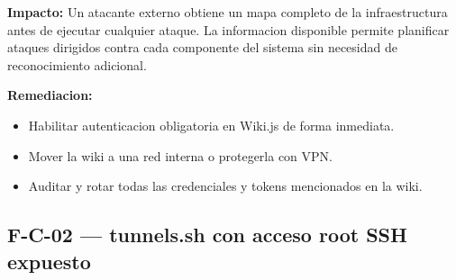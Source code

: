 \documentclass[11pt,a4paper]{article}
\begin{document}
\begin{tcolorbox}
\textbf{Impacto:}
Un atacante externo obtiene un mapa completo de la infraestructura antes de
ejecutar cualquier ataque. La informacion disponible permite planificar
ataques dirigidos contra cada componente del sistema sin necesidad de
reconocimiento adicional.

\textbf{Remediacion:}
\begin{itemize}[noitemsep]
  \item Habilitar autenticacion obligatoria en Wiki.js de forma inmediata.
  \item Mover la wiki a una red interna o protegerla con VPN.
  \item Auditar y rotar todas las credenciales y tokens mencionados en la wiki.
\end{itemize}
\end{tcolorbox}

\vspace{0.4cm}

\subsection{F-C-02 --- tunnels.sh con acceso root SSH expuesto}
\end{document}
